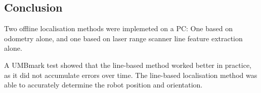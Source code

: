 \subsection{Conclusion}
Two offline localisation methods were implemeted on a PC:
One based on odometry alone, and one based on laser range scanner line feature extraction alone.

A UMBmark test showed that the line-based method worked better in practice, as it did not accumulate errors over time.
The line-based localisation method was able to accurately determine the robot position and orientation.